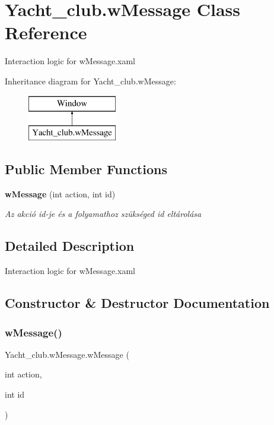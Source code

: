 \section{Yacht\+\_\+club.\+w\+Message Class Reference}
\label{class_yacht__club_1_1w_message}


Interaction logic for w\+Message.\+xaml  


Inheritance diagram for Yacht\+\_\+club.\+w\+Message\+:\begin{figure}[H]
\begin{center}
\leavevmode
\includegraphics[height=2.000000cm]{class_yacht__club_1_1w_message}
\end{center}
\end{figure}
\subsection*{Public Member Functions}
\begin{DoxyCompactItemize}
\item 
\textbf{ w\+Message} (int action, int id)
\begin{DoxyCompactList}\small\item\em Az akció id-\/je és a folyamathoz szükséged id eltárolása \end{DoxyCompactList}\end{DoxyCompactItemize}


\subsection{Detailed Description}
Interaction logic for w\+Message.\+xaml 



\subsection{Constructor \& Destructor Documentation}
\mbox{\label{class_yacht__club_1_1w_message_a92d68bf00eddabe763512d315981e0e2}} 
\subsubsection{w\+Message()}
{\footnotesize\ttfamily Yacht\+\_\+club.\+w\+Message.\+w\+Message (\begin{DoxyParamCaption}\item[{int}]{action,  }\item[{int}]{id }\end{DoxyParamCaption})}



